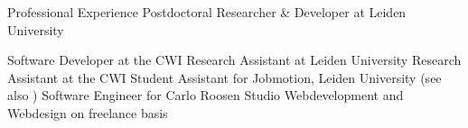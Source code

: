 
\begin{rubric}{Professional Experience}
		Postdoctoral Researcher \& Developer at Leiden University
	
		Software Developer at the CWI
		Research Assistant at Leiden University
		Research Assistant at the CWI
		Student Assistant for Jobmotion, Leiden University (see
		also )
		Software Engineer for Carlo Roosen Studio
		Webdevelopment and Webdesign on freelance basis
\end{rubric}
